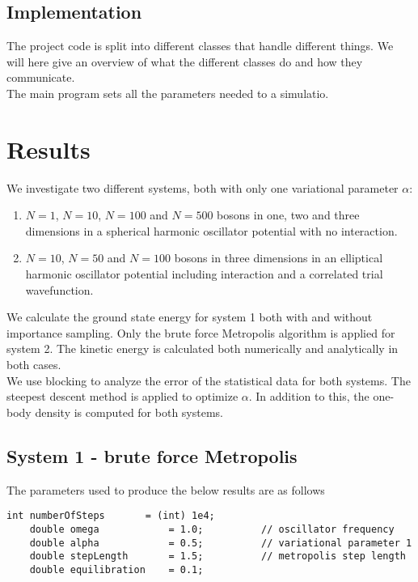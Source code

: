 \documentclass[english, a4paper]{article}
\begin{document}
\subsection{Implementation}

The project code is split into different classes that handle different things. We will here give an overview
of what the different classes do and how they communicate. \\

\noindent The main program sets all the parameters needed to a simulatio. 


\section{Results}

We investigate two different systems, both with only one variational parameter $\alpha$:
\begin{enumerate}
 \item $N=1$, $N=10$, $N=100$ and $N=500$ bosons in one, two and three dimensions in a
       spherical harmonic oscillator potential with no interaction.       
 \item $N=10$, $N=50$ and $N=100$ bosons in three dimensions
       in an elliptical harmonic oscillator potential including interaction and a
       correlated trial wavefunction. 
\end{enumerate}

We calculate the ground state energy for system 1 both with and without importance sampling.
Only the brute force Metropolis algorithm is applied for system 2.
The kinetic energy is calculated both numerically and analytically in both cases.\\

\noindent We use blocking to analyze the error of the statistical data for both systems.
The steepest descent method is applied to optimize $\alpha$. 
In addition to this, the one-body density is computed for both systems.


\subsection{System 1 - brute force Metropolis}

The parameters used to produce the below results are as follows
\belowcaptionskip=-10pt
\begin{lstlisting}[label=parameters1,caption=Parameters brute force Metropolis system 1]
    int numberOfSteps       = (int) 1e4;
    double omega            = 1.0;          // oscillator frequency
    double alpha            = 0.5;          // variational parameter 1
    double stepLength       = 1.5;          // metropolis step length
    double equilibration    = 0.1;          
\end{lstlisting}
\end{document}
